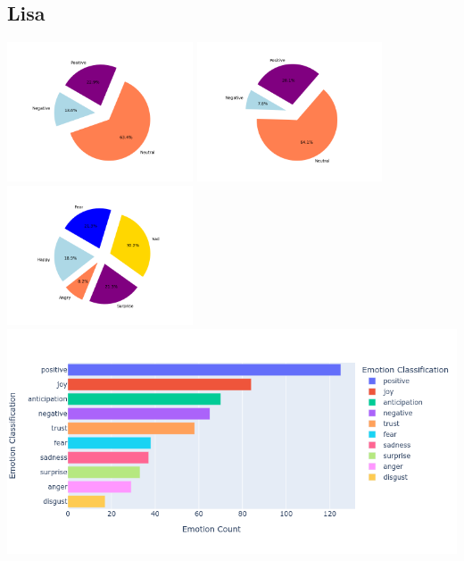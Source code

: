 \documentclass[a4paper,12pt]{article}
\begin{document}
	\subsection{Lisa}
	\begin{center}
		{\includegraphics[width=5.5cm]{lisasVaderEmotionalPie.png}}
		{\includegraphics[width=5.5cm]{lisasBlobEmotionalPie.png}}
		{\includegraphics[width=5.5cm]{lisasEmotionalPie.png}}\\
		{\includegraphics[width=16cm]{lisaNrcImage.png}}\\
	\end{center}
	\clearpage
\end{document}
